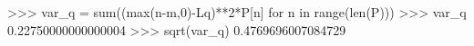 
>>> var_q = sum((max(n-m,0)-Lq)**2*P[n] for n in range(len(P)))
>>> var_q
0.22750000000000004
>>> sqrt(var_q)
0.4769696007084729

